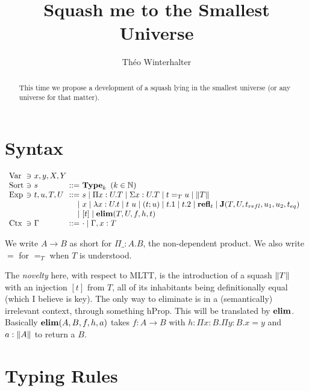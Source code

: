\documentclass[a4paper,english]{lipics-utf8x}
\title{Squash me to the Smallest Universe}
\author[1]{Théo Winterhalter}
\begin{document}
  \maketitle

  \begin{abstract}
    This time we propose a development of a squash lying in the smallest
    universe (or any universe for that matter).
  \end{abstract}

  \section{Syntax}

  \[
    \begin{array}{l@{~}l@{~}l@{~}r@{~}l@{\quad}l}
      \Var  & \ni & x,y,X,Y \\
      \Sort & \ni & s             & ::= & \Type_k \mbox{ }
                                                (k \in \mathbb{N}) \\
      \Exp  & \ni & t,u,T,U & ::= & s \mid \Pi x:U.T \mid \Sigma x:U.T \mid
                                    t =_T u \mid \squash{T} \\
                         &&& \mid & x \mid \lambda x:U.t \mid t~u
                               \mid (t;u) \mid t.1 \mid t.2 \mid \refl_t \mid
                               \J (T,U,t_{refl},u_1,u_2,t_{eq}) \\
                         &&& \mid & [t] \mid \elim(T,U,f,h,t) \\
      \Ctx  & \ni & \Gamma  & ::= & \cdot \mid \Gamma, x:T \\
    \end{array}
  \]

  \noindent %
  We write $A \to B$ as short for $\Pi \_:A.B$, the non-dependent product.
  We also write $=$ for $=_T$ when $T$ is understood.

  The \emph{novelty} here, with respect to MLTT, is the introduction of a squash
  $\|T\|$ with an injection $[t]$ from $T$, all of its inhabitants being
  definitionally equal (which I believe is key). The only way to eliminate is
  in a (semantically) irrelevant context, \ie through something hProp.
  This will be translated by $\operatorname{\mathbf{elim}}$.
  Basically $\operatorname{\mathbf{elim}}(A,B,f,h,a)$ takes $f : A \to B$ with
  $h : \Pi x:B. \Pi y:B. x = y$ and $a : \|A\|$ to return a $B$.

  \section{Typing Rules}
\end{document}
